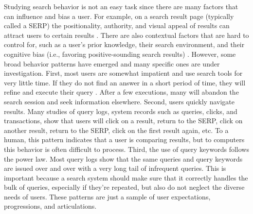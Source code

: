 Studying search behavior is not an easy task since there are many factors that can influence and bias a user. For example, on a search result page (typically called a \acrshort{SERP}) the positionality, authority, and visual appeal of results can attract users to certain results \cite{Hofmann2016}. There are also contextual factors that are hard to control for, such as a user's prior knowledge, their search environment, and their cognitive bias (i.e., favoring positive-sounding search results) \cite{Hofmann2016}. However, some broad behavior patterns have emerged and many specific ones are under investigation. First, most users are somewhat impatient and use search tools for very little time. If they do not find an answer in a short period of time, they will refine and execute their query . After a few executions, many will abandon the search session and seek information elsewhere. Second, users quickly navigate results. Many studies of query logs, system records such as queries, clicks, and transactions, show that users will click on a result, return to the SERP, click on another result, return to the SERP, click on the first result again, etc. To a human, this pattern indicates that a user is comparing results, but to computers this behavior is often difficult to process. Third, the use of query keywords follows the power law. Most query logs show that the same queries and query keywords are issued over and over with a very long tail of infrequent queries. This is important because a search system should make sure that it correctly handles the bulk of queries, especially if they're repeated, but also do not neglect the diverse needs of users. These patterns are just a sample of user expectations, progressions, and articulations.

